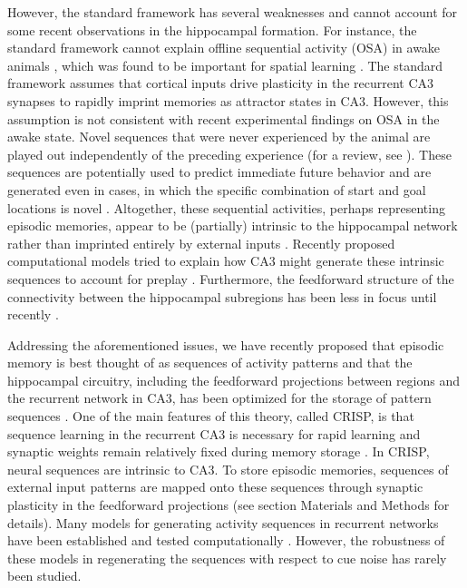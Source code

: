 \documentclass[utf8]{frontiersSCNS} %
\begin{document}
However, the standard framework has several weaknesses and cannot account for some recent observations in the hippocampal formation. For instance, the standard framework cannot explain offline sequential activity (OSA) in awake animals \cite{cheng2013crisp}, which was found to be important for spatial learning \cite{jadhav2012awake}. The standard framework assumes that cortical inputs drive plasticity in the recurrent CA3 synapses to rapidly imprint memories as attractor states in CA3. However, this assumption is not consistent with recent experimental findings on OSA in the awake state. Novel sequences that were never experienced by the animal are played out independently of the preceding experience \cite{gupta2010hippocampal} (for a review, see \cite{dragoi2011preplay}). These sequences are potentially used to predict immediate future behavior and are generated even in cases, in which the specific combination of start and goal locations is novel \cite{pfeiffer2013hippocampal}. Altogether, these sequential activities, perhaps representing episodic memories, appear to be (partially) intrinsic to the hippocampal network rather than imprinted entirely by external inputs \cite{cheng2013crisp}. Recently proposed computational models tried to explain how CA3 might generate these intrinsic sequences to account for preplay \cite{azizi2013computational, romani2015short}. 
%
Furthermore, the feedforward structure of the connectivity between the hippocampal subregions \cite{amaral1990chapter} has been less in focus until recently \cite{neher2015memory, pyka2014pattern}.  

Addressing the aforementioned issues, we have recently proposed that episodic memory is best thought of as sequences of activity patterns \cite{cheng2016dissociating, suddendorf2007evolution} and that the hippocampal circuitry, including the feedforward projections between regions and the recurrent network in CA3, has been optimized for the storage of pattern sequences \cite{cheng2013crisp}. 
%
%
One of the main features of this theory, called CRISP, is that sequence learning in the recurrent CA3 is necessary for rapid learning and synaptic weights remain relatively fixed during memory storage \cite{nakazawa2003hippocampal, cravens2006ca3}.
%
In CRISP, neural sequences are intrinsic to CA3. To store episodic memories, sequences of external input patterns are mapped onto these sequences through synaptic plasticity in the feedforward projections \cite{willshaw1969non} (see section Materials and Methods for details).
Many models for generating activity sequences in recurrent networks have been established and tested computationally \cite{sussillo2009generating, lazar2009sorn, rajan2016recurrent, jaeger2001echo, kropff2007complexity, bayati2015self}. However, the robustness of these models in regenerating the sequences with respect to cue noise has rarely been studied.
\end{document}
